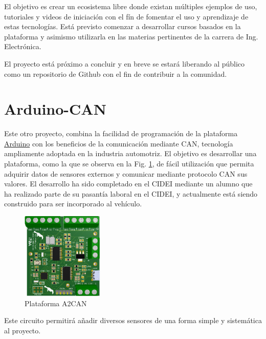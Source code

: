\documentclass[a4]{article}
\begin{document}
El objetivo es crear un ecosistema libre donde existan múltiples ejemplos de uso, tutoriales y videos de iniciación con el fín de fomentar el uso y aprendizaje de estas tecnologías. Está previsto comenzar a desarrollar cursos basados en la plataforma y asimismo utilizarla en las materias pertinentes de la carrera de Ing. Electrónica.

El proyecto está próximo a concluir y en breve se estará liberando al público como un repositorio de Github con el fin de contribuir a la comunidad.

\section{Arduino-CAN}
Este otro proyecto, combina la facilidad de programación de la plataforma \href{http://arduino.cc}{Arduino} con los beneficios de la comunicación mediante CAN, tecnología ampliamente adoptada en la industria automotriz. El objetivo es desarrollar una plataforma, como la que se observa en la Fig. \ref{fig:a2can}, de fácil utilización que permita adquirir datos de sensores externos y comunicar mediante protocolo CAN sus valores. El desarrollo ha sido completado en el CIDEI mediante un alumno que ha realizado parte de su pasantía laboral en el CIDEI, y actualmente está siendo construido para ser incorporado al vehículo.
%
\begin{figure}[h]
    \centering
    \includegraphics[width=0.35\textwidth]{figs/a2can.png}
    \caption{Plataforma A2CAN}
    \label{fig:a2can}
\end{figure}

Este circuito permitirá añadir diversos sensores de una forma simple y sistemática al proyecto.
\end{document}
